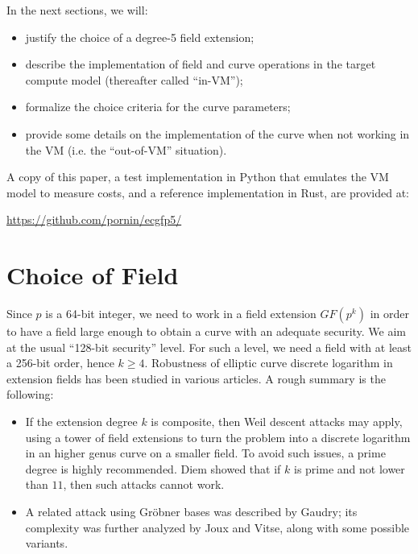 \documentclass{llncs}
\newcommand{\GF}{GF}
\begin{document}
In the next sections, we will:
\begin{itemize}

    \item justify the choice of a degree-5 field extension;

    \item describe the implementation of field and curve operations in the
    target compute model (thereafter called ``in-VM'');

    \item formalize the choice criteria for the curve parameters;

    \item provide some details on the implementation of the curve when
    not working in the VM (i.e. the ``out-of-VM'' situation).

\end{itemize}

A copy of this paper, a test implementation in Python that emulates the
VM model to measure costs, and a reference implementation in Rust, are
provided at:
\begin{center}
    \url{https://github.com/pornin/ecgfp5/}
\end{center}

\section{Choice of Field}

Since $p$ is a 64-bit integer, we need to work in a field extension
$\GF(p^k)$ in order to have a field large enough to obtain a curve with
an adequate security. We aim at the usual ``128-bit security'' level.
For such a level, we need a field with at least a 256-bit order, hence
$k \geq 4$. Robustness of elliptic curve discrete logarithm in extension
fields has been studied in various articles. A rough summary is the
following:
\begin{itemize}

    \item If the extension degree $k$ is composite, then Weil descent
    attacks may apply, using a tower of field extensions to turn the
    problem into a discrete logarithm in an higher genus curve on a
    smaller field\cite{GauHesSma2002,AriMatNagShi2004}. To avoid such
    issues, a prime degree is highly recommended. Diem showed that if
    $k$ is prime and not lower than $11$, then such attacks cannot
    work\cite{Die2003}.

    \item A related attack using Gröbner bases was described by
    Gaudry\cite{Gau2009}; its complexity was further analyzed by Joux
    and Vitse, along with some possible variants\cite{JouVit2013}.

\end{itemize}
\end{document}
